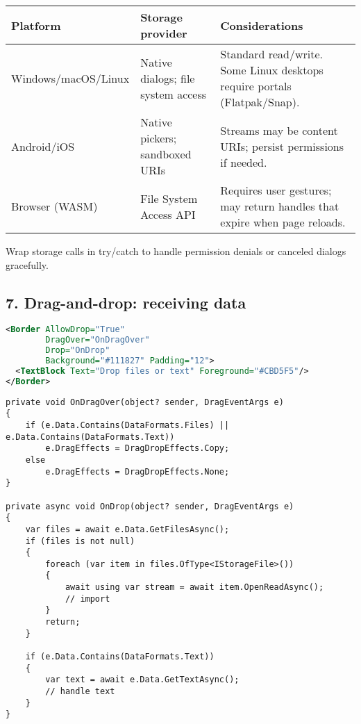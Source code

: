 \begin{longtable}[]{@{}
  >{\raggedright\arraybackslash}p{}
  >{\raggedright\arraybackslash}p{}
  >{\raggedright\arraybackslash}p{}@{}}
\toprule\noalign{}
\begin{minipage}[b]{\linewidth}\raggedright
Platform
\end{minipage} & \begin{minipage}[b]{\linewidth}\raggedright
Storage provider
\end{minipage} & \begin{minipage}[b]{\linewidth}\raggedright
Considerations
\end{minipage} \\
\midrule\noalign{}
\endhead
\bottomrule\noalign{}
\endlastfoot
Windows/macOS/Linux & Native dialogs; file system access & Standard
read/write. Some Linux desktops require portals (Flatpak/Snap). \\
Android/iOS & Native pickers; sandboxed URIs & Streams may be content
URIs; persist permissions if needed. \\
Browser (WASM) & File System Access API & Requires user gestures; may
return handles that expire when page reloads. \\
\end{longtable}

Wrap storage calls in try/catch to handle permission denials or canceled
dialogs gracefully.

\subsection{7. Drag-and-drop: receiving
data}\label{drag-and-drop-receiving-data}

\begin{lstlisting}[language=XML]
<Border AllowDrop="True"
        DragOver="OnDragOver"
        Drop="OnDrop"
        Background="#111827" Padding="12">
  <TextBlock Text="Drop files or text" Foreground="#CBD5F5"/>
</Border>
\end{lstlisting}

\begin{lstlisting}
private void OnDragOver(object? sender, DragEventArgs e)
{
    if (e.Data.Contains(DataFormats.Files) || e.Data.Contains(DataFormats.Text))
        e.DragEffects = DragDropEffects.Copy;
    else
        e.DragEffects = DragDropEffects.None;
}

private async void OnDrop(object? sender, DragEventArgs e)
{
    var files = await e.Data.GetFilesAsync();
    if (files is not null)
    {
        foreach (var item in files.OfType<IStorageFile>())
        {
            await using var stream = await item.OpenReadAsync();
            // import
        }
        return;
    }

    if (e.Data.Contains(DataFormats.Text))
    {
        var text = await e.Data.GetTextAsync();
        // handle text
    }
}
\end{lstlisting}

